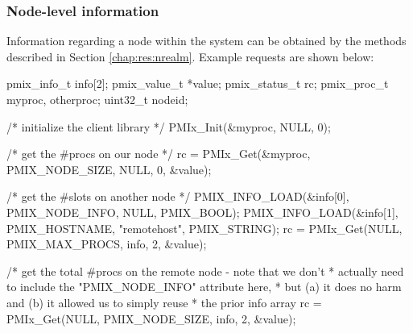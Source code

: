 \subsubsection{Node-level information}

Information regarding a node within the system can be obtained by the methods described in Section \ref{chap:res:nrealm}. Example requests are shown below:

\cspecificstart
\begin{codepar}
pmix_info_t info[2];
pmix_value_t *value;
pmix_status_t rc;
pmix_proc_t myproc, otherproc;
uint32_t nodeid;

/* initialize the client library */
PMIx_Init(&myproc, NULL, 0);

/* get the #procs on our node */
rc = PMIx_Get(&myproc, PMIX_NODE_SIZE, NULL, 0, &value);

/* get the #slots on another node */
PMIX_INFO_LOAD(&info[0], PMIX_NODE_INFO, NULL, PMIX_BOOL);
PMIX_INFO_LOAD(&info[1], PMIX_HOSTNAME, "remotehost", PMIX_STRING);
rc = PMIx_Get(NULL, PMIX_MAX_PROCS, info, 2, &value);

/* get the total #procs on the remote node - note that we don't
 * actually need to include the "PMIX_NODE_INFO" attribute here,
 * but (a) it does no harm and (b) it allowed us to simply reuse
 * the prior info array
rc = PMIx_Get(NULL, PMIX_NODE_SIZE, info, 2, &value);

\end{codepar}
\cspecificend

